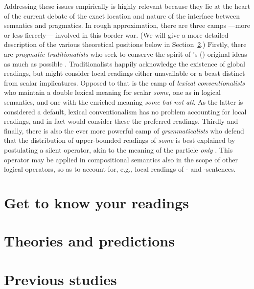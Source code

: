 \documentclass[fleqn,reqno,10pt]{article}
\newcommand{\as}{\acro{as}}
\renewcommand{\es}{\acro{es}}
\begin{document}
Addressing these issues empirically is highly relevant because they
lie at the heart of the current debate of the exact location and
nature of the interface between semantics and pragmatics. In rough
approximation, there are three camps ---more or less fiercely---
involved in this border war. (We will give a more detailed description
of the various theoretical positions below in
Section~\ref{sec:theories-predictions}.) Firstly, there are
\emph{pragmatic traditionalists} who seek to conserve the spirit of
\citeauthor{Grice1975:Logic-and-Conve}'s
(\citeyear{Grice1975:Logic-and-Conve}) original ideas as much as
possible
\citep[e.g.][]{Spector2006:Scalar-Implicat,Sauerland2004:Scalar-Implicat,Russell2006:Against-Grammat,vanRooijSchulz:ExhaustiveInterpretation,Geurts2010:Quantity-Implic,Franke2011:Quantity-Implic}. Traditionalists
happily acknowledge the existence of global readings, but might
consider local readings either unavailable or a beast distinct from
scalar implicatures. Opposed to that is the camp of \emph{lexical
  conventionalists}
\citep[e.g.][]{LevinsonPresumptiveMeanings2000,Chierchia:2004_ScalarImplicatures}
who maintain a double lexical meaning for scalar \emph{some}, one as
in logical semantics, and one with the enriched meaning \emph{some but
  not all}. As the latter is considered a default, lexical
conventionalism has no problem accounting for local readings, and in
fact would consider these the preferred readings. Thirdly and finally,
there is also the ever more powerful camp of \emph{grammaticalists}
who defend that the distribution of upper-bounded readings of
\emph{some} is best explained by postulating a silent operator, akin
to the meaning of the particle \emph{only} \citep{Chierchia2006:Broaden-Your-Vi,Fox2007:Free-Choice-and,ChierchiaFox2008:The-Grammatical,Chierchia2012:FC-Nominals-and,Sauerland2012:The-Computation}. This operator may be
applied in compositional semantics also in the scope of other logical
operators, so as to account for, e.g., local readings of \as- and
\es-sentences.





\bigskip





\section{Get to know your readings}
\label{sec:get-know-your}

\section{Theories and predictions}
\label{sec:theories-predictions}

\section{Previous studies}
\label{sec:previous-studies}





\printbibliography[heading=bibintoc]
\end{document}
